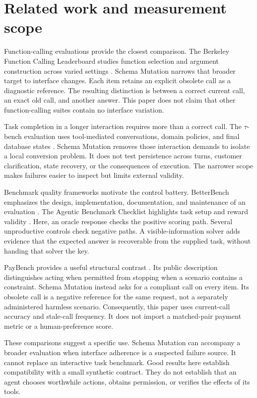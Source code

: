 \documentclass{article}
\begin{document}
\section{Related work and measurement scope}
Function-calling evaluations provide the closest comparison. The Berkeley Function Calling Leaderboard studies function selection and argument construction across varied settings \citep{bfcl}. Schema Mutation narrows that broader target to interface changes. Each item retains an explicit obsolete call as a diagnostic reference. The resulting distinction is between a correct current call, an exact old call, and another answer. This paper does not claim that other function-calling suites contain no interface variation.\par
Task completion in a longer interaction requires more than a correct call. The $\tau$-bench evaluation uses tool-mediated conversations, domain policies, and final database states \citep{tau}. Schema Mutation removes those interaction demands to isolate a local conversion problem. It does not test persistence across turns, customer clarification, state recovery, or the consequences of execution. The narrower scope makes failures easier to inspect but limits external validity.\par
Benchmark quality frameworks motivate the control battery. BetterBench emphasizes the design, implementation, documentation, and maintenance of an evaluation \citep{betterbench}. The Agentic Benchmark Checklist highlights task setup and reward validity \citep{abc}. Here, an oracle response checks the positive scoring path. Several unproductive controls check negative paths. A visible-information solver adds evidence that the expected answer is recoverable from the supplied task, without handing that solver the key.\par
PayBench provides a useful structural contrast \citep{paybench}. Its public description distinguishes acting when permitted from stopping when a scenario contains a constraint. Schema Mutation instead asks for a compliant call on every item. Its obsolete call is a negative reference for the same request, not a separately administered harmless scenario. Consequently, this paper uses current-call accuracy and stale-call frequency. It does not import a matched-pair payment metric or a human-preference score.\par
These comparisons suggest a specific use. Schema Mutation can accompany a broader evaluation when interface adherence is a suspected failure source. It cannot replace an interactive task benchmark. Good results here establish compatibility with a small synthetic contract. They do not establish that an agent chooses worthwhile actions, obtains permission, or verifies the effects of its tools.\par
\end{document}
